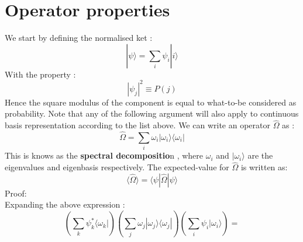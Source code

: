    \section{Operator properties}
   We start by defining the normalised ket :
   \begin{equation*}
   | \psi\rangle = \sum_i \psi_i | i\rangle
   \end{equation*}
   With the property :
   \begin{equation*}
   | \psi_j|^ 2 \equiv P (j) 
   \end{equation*}
   Hence the square modulus of the component is equal to  what-to-be considered as probability. Note that any of the following argument will  also apply to continuous basis representation according to the list above.
   We can write an operator $\hat{ \Omega}$ as :
   \[
   \hat{ \Omega} = \sum_i \omega_i | \omega_i\rangle \langle \omega_i|
   \]
   This is knows as the\textbf{ spectral decompositio}n , where $\omega_i$ and $| \omega_i\rangle$ are the eigenvalues and eigenbasis respectively.
   The expected-value for $ \hat{ \Omega}$ is written as:
   \[
   \langle\hat{ \Omega}\rangle = \langle \psi|\hat{\Omega}| \psi \rangle
   \]
   Proof:\\
   Expanding the above expression :
   \[
 \left(   \sum_k \psi^*_k \langle \omega_k| \right)  \left(   \sum_j \omega_j | \omega_j \rangle \langle \omega_j |\right) \left( \sum_i \psi_i | \omega_i\rangle \right) =
   \]

